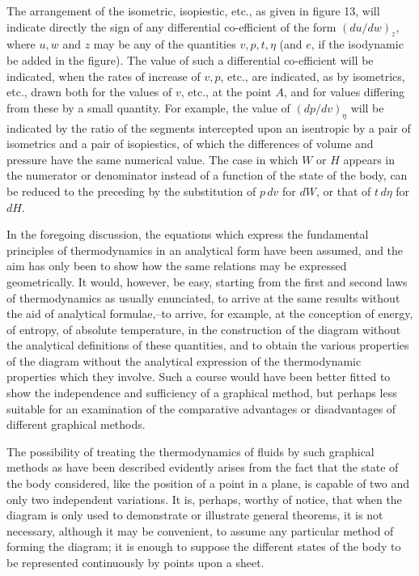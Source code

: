 \documentclass[11pt]{article}
\begin{document}
The arrangement of the isometric, isopiestic, etc., as given in figure 13, will indicate directly the sign of any differential co-efficient of the form $\left(du/dw\right)_z$, where $u,w$ and $z$ may be any of the quantities $v,p,t,\eta$ (and $e$, if the isodynamic be added in the figure). The value of such a differential co-efficient will be indicated, when the rates of increase of $v,p$, etc., are indicated, as by isometrics, etc., drawn both for the values of $v$, etc., at the point $A$, and for values differing from these by a small quantity. For example, the value of $\left(dp/dv\right)_\eta$ will be indicated by the ratio of the segments intercepted upon an isentropic by a pair of isometrics and a pair of isopiestics, of which the differences of volume and pressure have the same numerical value. The case in which $W$ or $H$ appears in the numerator or denominator instead of a function of the state of the body, can be reduced to the preceding by the substitution of $p\,dv$ for $dW$, or that of $t\,d\eta$ for $dH$.

In the foregoing discussion, the equations which express the fundamental principles of thermodynamics in an analytical form have been assumed, and the aim has only been to show how the same relations may be expressed geometrically. It would, however, be easy, starting from the first and second laws of thermodynamics as usually enunciated, to arrive at the same results without the aid of analytical formulae,--to arrive, for example, at the conception of energy, of entropy, of absolute temperature, in the construction of the diagram without the analytical definitions of these quantities, and to obtain the various properties of the diagram without the analytical expression of the thermodynamic properties which they involve. Such a course would have been better fitted to show the independence and sufficiency of a graphical method, but perhaps less suitable for an examination of the comparative advantages or disadvantages of different graphical methods.

The possibility of treating the thermodynamics of fluids by such graphical methods as have been described evidently arises from the fact that the state of the body considered, like the position of a point in a plane, is capable of two and only two independent variations. It is, perhaps, worthy of notice, that when the diagram is only used to demonstrate or illustrate general theorems, it is not necessary, although it may be convenient, to assume any particular method of forming the diagram; it is enough to suppose the different states of the body to be represented continuously by points upon a sheet.
\end{document}
